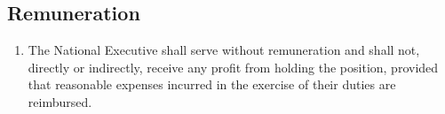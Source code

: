 \subsection{Remuneration}
\label{remuneration-1}

\begin{enumerate}
 \item
  The National Executive shall serve without remuneration and shall not, directly or indirectly, receive any profit from holding the position, provided that reasonable expenses incurred in the exercise of their duties are reimbursed.
\end{enumerate}
